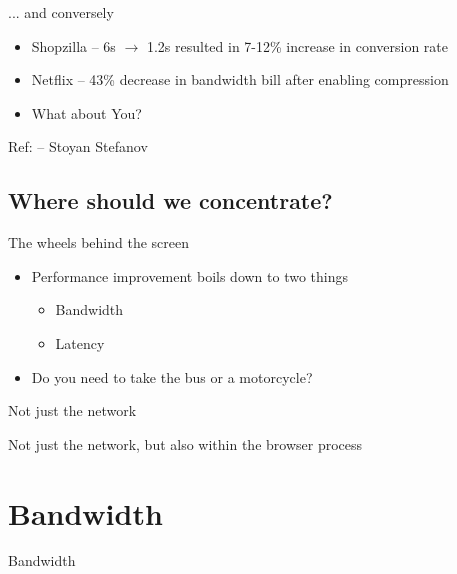 \documentclass{beamer}
\begin{document}
\begin{frame}{... and conversely}
  \begin{itemize}
  \item Shopzilla -- 6s $\rightarrow$ 1.2s resulted in 7-12\% increase in conversion rate
  \item Netflix -- 43\% decrease in bandwidth bill after enabling compression
  \item<2-> What about You?
  \end{itemize}
  \vfill
  \tiny{Ref: \href{http://www.slideshare.net/stoyan/the-business-of-performance}{} -- Stoyan Stefanov}
\end{frame}

\subsection{Where should we concentrate?}

\begin{frame}{The wheels behind the screen}
  \begin{itemize}
  \item Performance improvement boils down to two things
    \begin{itemize}
    \item<2-> Bandwidth
    \item<3-> Latency
    \end{itemize}
  \item<4-> Do you need to take the bus or a motorcycle?
  \end{itemize}
\end{frame}

\begin{frame}{Not just the network}
  \begin{center}
  Not just the network, but also within the browser process
  \end{center}
\end{frame}

\section{Bandwidth}

\begin{frame}{}
  \begin{block}{}
  \begin{center}
  Bandwidth
  \end{center}
  \end{block}
\end{frame}
\end{document}

